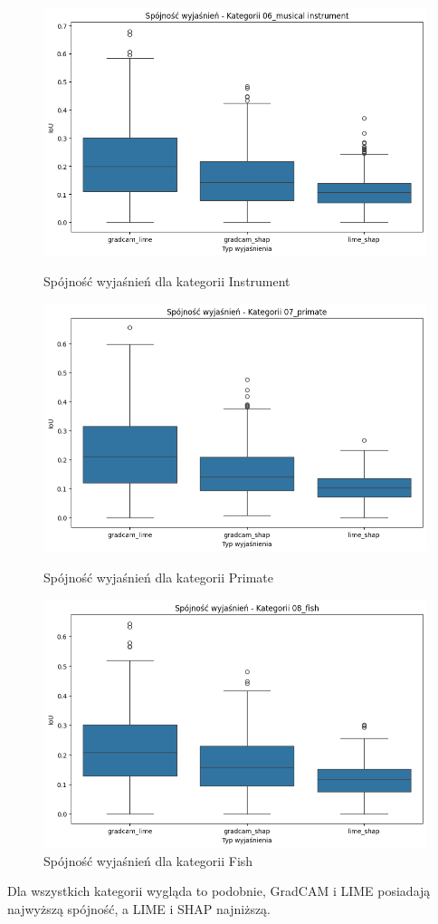 \begin{figure}
	\centering
	\begin{minipage}[b]{0.3\textwidth}
		\centering\includegraphics[width=.9\textwidth]{img/base_coherence_music}
		\caption{Spójność wyjaśnień dla kategorii Instrument}  \label{}
	\end{minipage}
	\begin{minipage}[b]{0.3\textwidth}
		\centering\includegraphics[width=.9\textwidth]{img/base_coherence_primate}
		\caption{Spójność wyjaśnień dla kategorii Primate}  \label{}
	\end{minipage}
	\begin{minipage}[b]{0.3\textwidth}
		\centering\includegraphics[width=.9\textwidth]{img/base_coherence_fish}
		\caption{Spójność wyjaśnień dla kategorii Fish}  \label{}
	\end{minipage}
\end{figure}

Dla wszystkich kategorii wygląda to podobnie, GradCAM i LIME posiadają najwyższą spójność, a LIME i SHAP najniższą.
